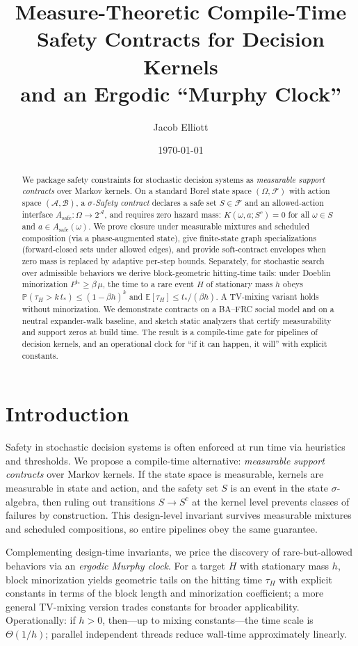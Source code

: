 \documentclass[11pt]{article}
\title{\vspace{-0.5em}Measure-Theoretic Compile-Time Safety Contracts for Decision Kernels\\
and an Ergodic ``Murphy Clock''}
\author{Jacob Elliott}
\date{\today}
\theoremstyle{plain}
\theoremstyle{definition}
\theoremstyle{remark}
\newcommand{\Prb}{\mathbb{P}}
\newcommand{\E}{\mathbb{E}}
\newcommand{\A}{\mathcal{A}}
\newcommand{\F}{\mathcal{F}}
\newcommand{\B}{\mathcal{B}}
\begin{document}
\maketitle

\begin{abstract}
We package safety constraints for stochastic decision systems as \emph{measurable support contracts} over Markov kernels. On a standard Borel state space $(\Omega,\F)$ with action space $(\A,\B)$, a \emph{$\sigma$-Safety contract} declares a safe set $S\in\F$ and an allowed-action interface $A_{\mathrm{safe}}:\Omega\to 2^{\A}$, and requires zero hazard mass: $K(\omega,a;S^c)=0$ for all $\omega\in S$ and $a\in A_{\mathrm{safe}}(\omega)$. We prove closure under measurable mixtures and scheduled composition (via a phase-augmented state), give finite-state graph specializations (forward-closed sets under allowed edges), and provide soft-contract envelopes when zero mass is replaced by adaptive per-step bounds. Separately, for stochastic search over admissible behaviors we derive block-geometric hitting-time tails: under Doeblin minorization $P^{t_*}\ge \beta\,\mu$, the time to a rare event $H$ of stationary mass $h$ obeys $\Prb(\tau_H>k\,t_*)\le (1-\beta h)^k$ and $\E[\tau_H]\le t_*/(\beta h)$. A TV-mixing variant holds without minorization. We demonstrate contracts on a BA--FRC social model and on a neutral expander-walk baseline, and sketch static analyzers that certify measurability and support zeros at build time. The result is a compile-time gate for pipelines of decision kernels, and an operational clock for ``if it can happen, it will'' with explicit constants.
\end{abstract}

\section{Introduction}

Safety in stochastic decision systems is often enforced at run time via heuristics and thresholds. We propose a compile-time alternative: \emph{measurable support contracts} over Markov kernels. If the state space is measurable, kernels are measurable in state and action, and the safety set $S$ is an event in the state $\sigma$-algebra, then ruling out transitions $S\to S^c$ at the kernel level prevents classes of failures by construction. This design-level invariant survives measurable mixtures and scheduled compositions, so entire pipelines obey the same guarantee.

Complementing design-time invariants, we price the discovery of rare-but-allowed behaviors via an \emph{ergodic Murphy clock}. For a target $H$ with stationary mass $h$, block minorization yields geometric tails on the hitting time $\tau_H$ with explicit constants in terms of the block length and minorization coefficient; a more general TV-mixing version trades constants for broader applicability. Operationally: if $h>0$, then---up to mixing constants---the time scale is $\Theta(1/h)$; parallel independent threads reduce wall-time approximately linearly.
\end{document}
